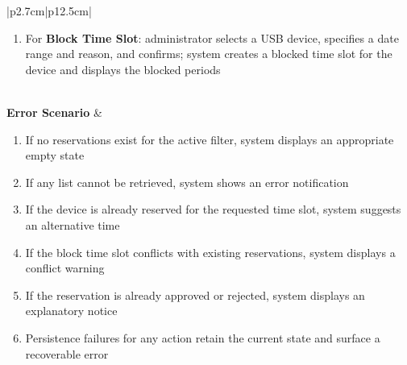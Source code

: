 \begin{table}[H]
\begin{tabular}{|p{2.7cm}|p{12.5cm}|}
\begin{minipage}[t]{\linewidth}
\begin{enumerate}[topsep=0pt,itemsep=1pt,parsep=0pt,partopsep=0pt]
                \item For \textbf{Block Time Slot}: administrator selects a USB device, specifies a date range and reason, and confirms; system creates a blocked time slot for the device and displays the blocked periods
            \end{enumerate}
        \end{minipage} \\
        \hline
        \textbf{Error Scenario} & \begin{minipage}[t]{\linewidth}
            \begin{enumerate}[topsep=0pt,itemsep=1pt,parsep=0pt,partopsep=0pt]
                \item If no reservations exist for the active filter, system displays an appropriate empty state
                \item If any list cannot be retrieved, system shows an error notification
                \item If the device is already reserved for the requested time slot, system suggests an alternative time
                \item If the block time slot conflicts with existing reservations, system displays a conflict warning
                \item If the reservation is already approved or rejected, system displays an explanatory notice
                \item Persistence failures for any action retain the current state and surface a recoverable error
            \end{enumerate}
        \end{minipage} \\
        \hline
    \end{tabular}
    \label{tab:admin-usb-reservations}
\end{table}
